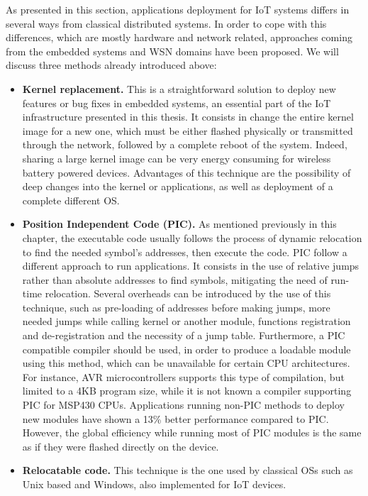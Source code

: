 As presented in this section, applications deployment for IoT systems differs in several ways from classical distributed systems.
In order to cope with this differences, which are mostly hardware and network related, approaches coming from the embedded systems and WSN domains have been proposed.
We will discuss three methods already introduced above: 
\begin{itemize}
	\item \textbf{Kernel replacement.} This is a straightforward solution to deploy new features or bug fixes in embedded systems, an essential part of the IoT infrastructure presented in this thesis.
	It consists in change the entire kernel image for a new one, which must be either flashed physically or transmitted through the network, followed by a complete reboot of the system.
	Indeed, sharing a large kernel image can be very energy consuming for wireless battery powered devices.
	Advantages of this technique are the possibility of deep changes into the kernel or applications, as well as deployment of a complete different OS.
	\item \textbf{Position Independent Code (PIC).} As mentioned previously in this chapter, the executable code usually follows the process of dynamic relocation to find the needed symbol's addresses, then execute the code. 
	PIC follow a different approach to run applications. 
	It consists in the use of relative jumps rather than absolute addresses to find symbols, mitigating the need of run-time relocation.
	Several overheads can be introduced by the use of this technique, such as pre-loading of addresses before making jumps, more needed jumps while calling kernel or another module, functions registration and de-registration and the necessity of a jump table.
	Furthermore, a PIC compatible compiler should be used, in order to produce a loadable module using this method, which can be unavailable for certain CPU architectures.
	For instance, AVR microcontrollers supports this type of compilation, but limited to a 4KB program size, while it is not known a compiler supporting PIC for MSP430 CPUs.
	Applications running non-PIC methods to deploy new modules have shown a 13\% better performance compared to PIC\cite{dong2009dynamic}.
	However, the global efficiency while running most of PIC modules is the same as if they were flashed directly on the device.
	\item \textbf{Relocatable code.} This technique is the one used by classical OSs such as Unix based and Windows, also implemented for IoT devices\cite{dunkels06runtime}. 

\end{itemize}
